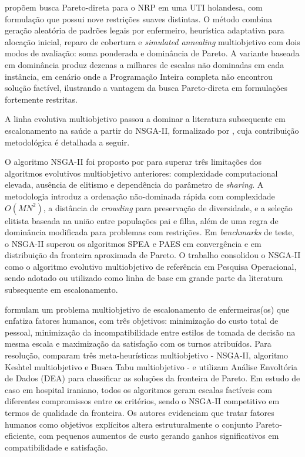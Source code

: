  propõem busca Pareto-direta para o NRP em uma UTI holandesa, com formulação que possui nove restrições suaves distintas. O método combina geração aleatória de padrões legais por enfermeiro, heurística adaptativa para alocação inicial, reparo de cobertura e \textit{simulated annealing} multiobjetivo com dois modos de avaliação: soma ponderada e dominância de Pareto. A variante baseada em dominância produz dezenas a milhares de escalas não dominadas em cada instância, em cenário onde a Programação Inteira completa não encontrou solução factível, ilustrando a vantagem da busca Pareto-direta em formulações fortemente restritas.

A linha evolutiva multiobjetivo passou a dominar a literatura subsequente em escalonamento na saúde a partir do NSGA-II, formalizado por , cuja contribuição metodológica é detalhada a seguir.

O algoritmo NSGA-II foi proposto por  para superar três limitações dos algoritmos evolutivos multiobjetivo anteriores: complexidade computacional elevada, ausência de elitismo e dependência do parâmetro de \textit{sharing}. A metodologia introduz a ordenação não-dominada rápida com complexidade $O(MN^{2})$, a distância de \textit{crowding} para preservação de diversidade, e a seleção elitista baseada na união entre populações pai e filha, além de uma regra de dominância modificada para problemas com restrições. Em \textit{benchmarks} de teste, o NSGA-II superou os algoritmos SPEA e PAES em convergência e em distribuição da fronteira aproximada de Pareto. O trabalho consolidou o NSGA-II como o algoritmo evolutivo multiobjetivo de referência em Pesquisa Operacional, sendo adotado ou utilizado como linha de base em grande parte da literatura subsequente em escalonamento.

 formulam um problema multiobjetivo de escalonamento de enfermeiras(os) que enfatiza fatores humanos, com três objetivos: minimização do custo total de pessoal, minimização da incompatibilidade entre estilos de tomada de decisão na mesma escala e maximização da satisfação com os turnos atribuídos. Para resolução, comparam três meta-heurísticas multiobjetivo - NSGA-II, algoritmo Keshtel multiobjetivo e Busca Tabu multiobjetivo - e utilizam Análise Envoltória de Dados (DEA) para classificar as soluções da fronteira de Pareto. Em estudo de caso em hospital iraniano, todos os algoritmos geram escalas factíveis com diferentes compromissos entre os critérios, sendo o NSGA-II competitivo em termos de qualidade da fronteira. Os autores evidenciam que tratar fatores humanos como objetivos explícitos altera estruturalmente o conjunto Pareto-eficiente, com pequenos aumentos de custo gerando ganhos significativos em compatibilidade e satisfação.


